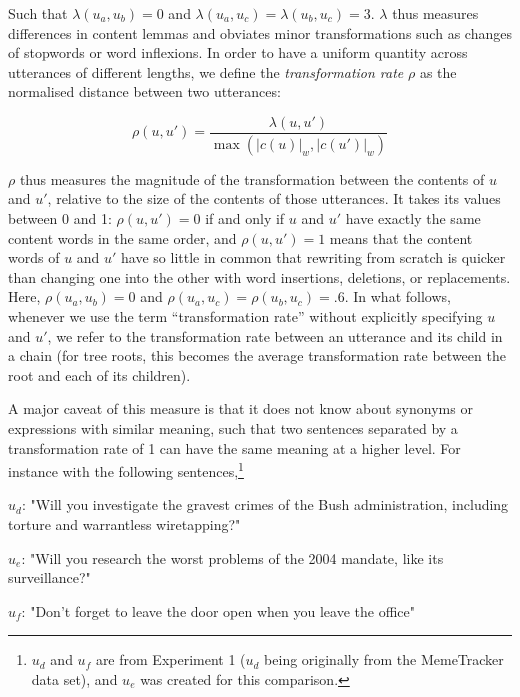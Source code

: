 Such that \(\lambda(u_a, u_b) = 0\) and
\(\lambda(u_a, u_c) = \lambda(u_b, u_c) = 3\). \(\lambda\) thus measures
differences in content lemmas and obviates minor transformations such as
changes of stopwords or word inflexions. In order to have a uniform
quantity across utterances of different lengths, we define the
\emph{transformation rate} \(\rho\) as the normalised distance between
two utterances:

\[\rho(u, u') = \frac{\lambda(u, u')}{\max\left(|c(u)|_w, |c(u')|_w\right)}\]

\(\rho\) thus measures the magnitude of the transformation between the
contents of \(u\) and \(u'\), relative to the size of the contents of
those utterances. It takes its values between 0 and 1:
\(\rho(u, u') = 0\) if and only if \(u\) and \(u'\) have exactly the
same content words in the same order, and \(\rho(u, u') = 1\) means that
the content words of \(u\) and \(u'\) have so little in common that
rewriting from scratch is quicker than changing one into the other with
word insertions, deletions, or replacements. Here,
\(\rho(u_a, u_b) = 0\) and \(\rho(u_a, u_c) = \rho(u_b, u_c) = .6\). In
what follows, whenever we use the term \enquote{transformation rate}
without explicitly specifying \(u\) and \(u'\), we refer to the
transformation rate between an utterance and its child in a chain (for
tree roots, this becomes the average transformation rate between the
root and each of its children).

A major caveat of this measure is that it does not know about synonyms
or expressions with similar meaning, such that two sentences separated
by a transformation rate of 1 can have the same meaning at a higher
level. For instance with the following sentences,\footnote{\(u_d\) and
  \(u_f\) are from Experiment 1 (\(u_d\) being originally from the
  MemeTracker data set), and \(u_e\) was created for this comparison.}

\begin{nquote}
  $u_d$: "Will you investigate the gravest crimes of the Bush administration, including torture and warrantless wiretapping?"
\end{nquote}\begin{nquote}
  $u_e$: "Will you research the worst problems of the 2004 mandate, like its surveillance?"
\end{nquote}\begin{nquote}
  $u_f$: "Don't forget to leave the door open when you leave the office"
\end{nquote}

